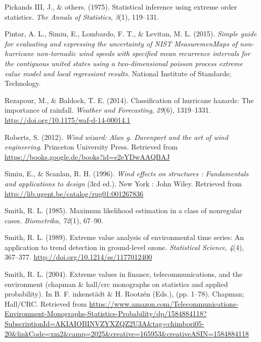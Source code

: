\documentclass[12pt,oneside]{reedthesis}
\begin{document}
\leavevmode\hypertarget{ref-PickandsIII1975}{}%
Pickands III, J., \& others. (1975). Statistical inference using extreme order statistics. \emph{The Annals of Statistics}, \emph{3}(1), 119--131.

\leavevmode\hypertarget{ref-Pintar2015}{}%
Pintar, A. L., Simiu, E., Lombardo, F. T., \& Levitan, M. L. (2015). \emph{Simple guide for evaluating and expressing the uncertainty of NIST MeasuremenMaps of non-hurricane non-tornadic wind speeds with specified mean recurrence intervals for the contiguous united states using a two-dimensional poisson process extreme value model and local regressiont results}. National Institute of Standards; Technology.

\leavevmode\hypertarget{ref-Rezapour2014}{}%
Rezapour, M., \& Baldock, T. E. (2014). Classification of hurricane hazards: The importance of rainfall. \emph{Weather and Forecasting}, \emph{29}(6), 1319--1331. \url{http://doi.org/10.1175/waf-d-14-00014.1}

\leavevmode\hypertarget{ref-Roberts2012}{}%
Roberts, S. (2012). \emph{Wind wizard: Alan g. Davenport and the art of wind engineering}. Princeton University Press. Retrieved from \url{https://books.google.de/books?id=e2eYDwAAQBAJ}

\leavevmode\hypertarget{ref-Simiu1996}{}%
Simiu, E., \& Scanlan, R. H. (1996). \emph{Wind effects on structures : Fundamentals and applications to design} (3rd ed.). New York : John Wiley. Retrieved from \url{http://lib.ugent.be/catalog/rug01:001267836}

\leavevmode\hypertarget{ref-Smith1985}{}%
Smith, R. L. (1985). Maximum likelihood estimation in a class of nonregular cases. \emph{Biometrika}, \emph{72}(1), 67--90.

\leavevmode\hypertarget{ref-Smith1989}{}%
Smith, R. L. (1989). Extreme value analysis of environmental time series: An application to trend detection in ground-level ozone. \emph{Statistical Science}, \emph{4}(4), 367--377. \url{http://doi.org/10.1214/ss/1177012400}

\leavevmode\hypertarget{ref-Smith2004}{}%
Smith, R. L. (2004). Extreme values in finance, telecommunications, and the environment (chapman \& hall/crc monographs on statistics and applied probability). In B. F. inkenstädt \& H. Rootzén (Eds.), (pp. 1--78). Chapman; Hall/CRC. Retrieved from \url{https://www.amazon.com/Telecommunications-Environment-Monographs-Statistics-Probability/dp/1584884118?SubscriptionId=AKIAIOBINVZYXZQZ2U3A\&tag=chimbori05-20\&linkCode=xm2\&camp=2025\&creative=165953\&creativeASIN=1584884118}
\end{document}
